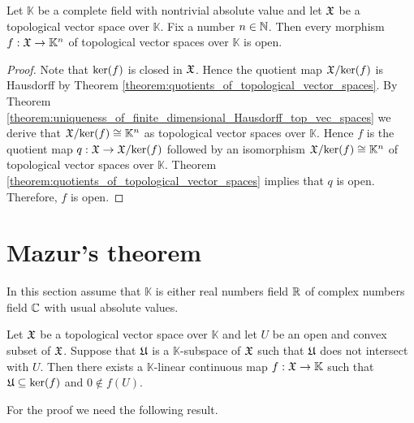 \begin{corollary}\label{corollary:continuous_map_to_standard_finite_dimensional_is_open}
Let $\mathbb{K}$ be a complete field with nontrivial absolute value and let ${\mathfrak X}$ be a topological vector space over $\mathbb{K}$. Fix a number $n \in {\mathbb N}$. Then every morphism $f:{\mathfrak X}\rightarrow \mathbb{K}^n$ of topological vector spaces over $\mathbb{K}$ is open.
\end{corollary}
\begin{proof}
Note that $\mathrm{ker}(f)$ is closed in ${\mathfrak X}$. Hence the quotient map ${\mathfrak X}/\mathrm{ker}(f)$ is Hausdorff by Theorem \ref{theorem:quotients_of_topological_vector_spaces}. By Theorem \ref{theorem:uniqueness_of_finite_dimensional_Hausdorff_top_vec_spaces} we derive that ${\mathfrak X}/\mathrm{ker}(f) \cong \mathbb{K}^n$ as topological vector spaces over $\mathbb{K}$. Hence $f$ is the quotient map $q:{\mathfrak X}\rightarrow {\mathfrak X}/\mathrm{ker}(f)$ followed by an isomorphism ${\mathfrak X}/\mathrm{ker}(f)\cong \mathbb{K}^n$ of topological vector spaces over $\mathbb{K}$. Theorem \ref{theorem:quotients_of_topological_vector_spaces} implies that $q$ is open. Therefore, $f$ is open.  
\end{proof}

\section{Mazur's theorem}
\noindent
In this section assume that $\mathbb{K}$ is either real numbers field ${\mathbb R}$ of complex numbers field ${\mathbb C}$ with usual absolute values.

\begin{theorem}[Mazur]\label{theorem:Mazurs_hyperplane_separation}
Let ${\mathfrak X}$ be a topological vector space over $\mathbb{K}$ and let $U$ be an open and convex subset of ${\mathfrak X}$. Suppose that ${\mathfrak U}$ is a $\mathbb{K}$-subspace of ${\mathfrak X}$ such that ${\mathfrak U}$ does not intersect with $U$. Then there exists a $\mathbb{K}$-linear continuous map $f:{\mathfrak X}\rightarrow \mathbb{K}$ such that ${\mathfrak U} \subseteq \mathrm{ker}(f)$ and $0 \not \in f(U)$.
\end{theorem}
\noindent
For the proof we need the following result.

